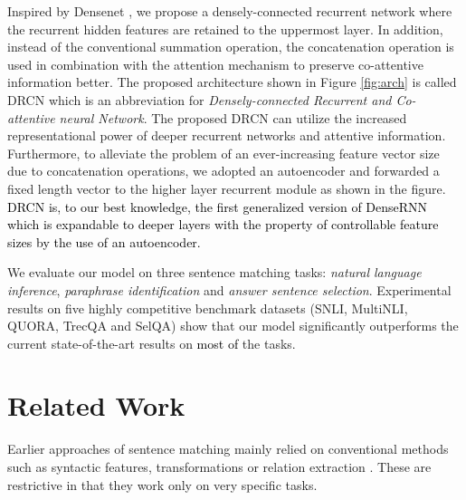 \documentclass[letterpaper]{article} \usepackage{aaai19}  \usepackage{times}  \usepackage{helvet}  \usepackage{courier}  \usepackage{url}  \usepackage{graphicx}  \frenchspacing  \setlength{\pdfpagewidth}{8.5in}  \setlength{\pdfpageheight}{11in}
\newcommand\sh[1]{\textcolor{black}{#1}}
\newcommand\shh[1]{\textcolor{black}{#1}}
\begin{document}
Inspired by Densenet \cite{huang2017densely}, we propose a densely-connected recurrent network where the recurrent hidden features are retained to the uppermost layer. In addition, instead of the conventional summation operation, the concatenation operation is used in combination with the attention mechanism to preserve co-attentive information better. 
The proposed architecture shown in Figure \ref{fig:arch} is called DRCN which is an abbreviation for \textit{Densely-connected Recurrent and Co-attentive neural Network}. 
The proposed DRCN can utilize the increased representational power of deeper recurrent networks and attentive information. 
Furthermore, to alleviate the problem of an ever-increasing feature vector size due to concatenation operations, we adopted an autoencoder and forwarded a fixed length vector to the higher layer recurrent module as shown in the figure.
\sh{DRCN is, to our best knowledge, the first generalized version of DenseRNN which is expandable to deeper layers with the property of controllable feature sizes by the use of an autoencoder.}

We evaluate our model on three sentence matching tasks: \textit{natural language inference}, \textit{paraphrase identification} and \textit{answer sentence selection}. Experimental results on five highly competitive benchmark datasets (SNLI, MultiNLI, QUORA, TrecQA and SelQA) show that our model significantly outperforms the current state-of-the-art results on 
\shh{most of} the tasks.




\section{Related Work}
\label{sec:rel}
Earlier approaches of sentence matching mainly relied on conventional methods such as syntactic features, transformations or relation extraction \cite{romano2006investigating,wang2007jeopardy}.  These are restrictive in that they work only on very specific tasks.
\end{document}
